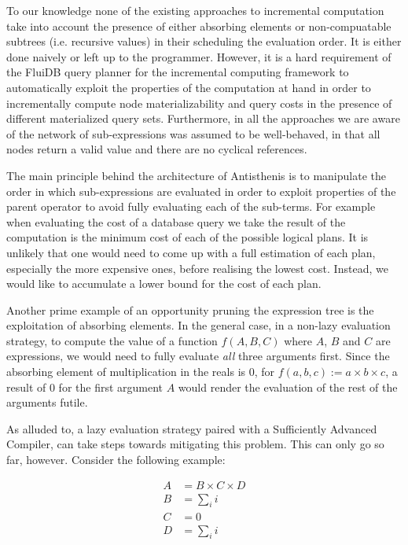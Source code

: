 To our knowledge none of the existing approaches to incremental
computation take into account the presence of either absorbing
elements or non-compuatable subtrees (i.e. recursive values) in their
scheduling the evaluation order. It is either done naively or left up
to the programmer. However, it is a hard requirement of the FluiDB
query planner for the incremental computing framework to automatically
exploit the properties of the computation at hand in order to
incrementally compute node materializability and query costs in the
presence of different materialized query sets. Furthermore, in all the
approaches we are aware of the network of sub-expressions was assumed
to be well-behaved, in that all nodes return a valid value and there
are no cyclical references.

The main principle behind the architecture of Antisthenis is to
manipulate the order in which sub-expressions are evaluated in order
to exploit properties of the parent operator to avoid fully evaluating
each of the sub-terms. For example when evaluating the cost of a
database query we take the result of the computation is the minimum
cost of each of the possible logical plans. It is unlikely that one
would need to come up with a full estimation of each plan, especially
the more expensive ones, before realising the lowest cost. Instead, we
would like to accumulate a lower bound for the cost of each plan.

Another prime example of an opportunity pruning the expression tree is
the exploitation of absorbing elements. In the general case, in a
non-lazy evaluation strategy, to compute the value of a function
\(f(A,B,C)\) where \(A\), \(B\) and \(C\) are expressions, we would
need to fully evaluate \emph{all} three arguments first. Since the
absorbing element of multiplication in the reals is 0, for
\(f(a,b,c) := a \times b \times c\), a result of 0 for the first
argument \(A\) would render the evaluation of the rest of the
arguments futile.

As alluded to, a lazy evaluation strategy paired with a Sufficiently
Advanced Compiler, can take steps towards mitigating this
problem. This can only go so far, however. Consider the following
example:

\begin{align*}
A &= B \times C \times D \\
B &= \sum_i{i} \\
C &= 0 \\
D &= \sum_i{i}
\end{align*}

